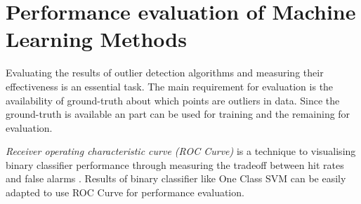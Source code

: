 \chapter{Performance evaluation of Machine Learning Methods}\label{Chapter:4}


Evaluating the results of outlier detection algorithms and measuring their effectiveness is an essential task. The main requirement for evaluation is the availability of ground-truth about which points are outliers in data. Since the ground-truth is available an part can be used for training and the remaining for evaluation. 

\textit{Receiver operating characteristic curve (ROC Curve) } is a technique to visualising binary classifier performance through measuring the tradeoff between hit rates and false alarms \cite{Fawcett:2006:IRA:1159473.1159475}. Results of binary classifier like One Class SVM can be easily adapted to use ROC Curve for performance evaluation.




